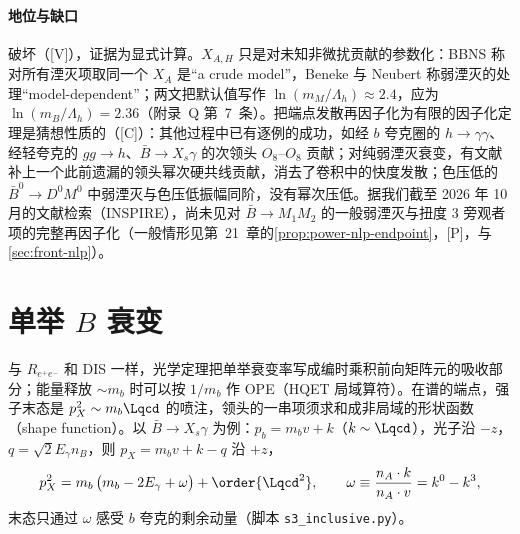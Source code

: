 \paragraph{地位与缺口}
破坏（[V]），证据为显式计算。$X_{A,H}$ 只是对未知非微扰贡献的参数化：BBNS 称对所有湮灭项取同一个 $X_A$ 是“a crude model”\cite{BenekeEtAl2001}，Beneke 与 Neubert 称弱湮灭的处理“model-dependent”\cite{BenekeNeubert2003}；两文把默认值写作 $\ln(m_M/\Lambda_h)\approx2.4$，应为 $\ln(m_B/\Lambda_h)=2.36$（附录~Q 第~7~条）。把端点发散再因子化为有限的因子化定理是猜想性质的（[C]）：其他过程中已有逐例的成功，如经 $b$ 夸克圈的 $h\to\gamma\gamma$\cite{Liu:2019oav,Liu:2020wbn}、经轻夸克的 $gg\to h$\cite{Liu:2022ajh}、$\bar B\to X_s\gamma$ 的次领头 $O_8$--$O_8$ 贡献\cite{Hurth:2023paz}；对纯弱湮灭衰变，有文献补上一个此前遗漏的领头幂次硬共线贡献，消去了卷积中的快度发散\cite{Lu:2022kos}；色压低的 $\bar B^0\to D^0M^0$ 中弱湮灭与色压低振幅同阶，没有幂次压低\cite{Mantry:2003uz}。据我们截至 2026 年 10 月的文献检索（INSPIRE），尚未见对 $\bar B\to M_1M_2$ 的一般弱湮灭与扭度 3 旁观者项的完整再因子化（一般情形见第~21~章的\cref{prop:power-nlp-endpoint}，[P]，与\cref{sec:front-nlp}）。

\section{单举 $B$ 衰变}\label{sec:heavy-inclusive}

与 $R_{e^+e^-}$ 和 DIS 一样，光学定理把单举衰变率写成编时乘积前向矩阵元的吸收部分；能量释放 $\sim m_b$ 时可以按 $1/m_b$ 作 OPE（HQET 局域算符）。在谱的端点，强子末态是 $p_X^2\sim m_b\Lqcd$ 的喷注，领头的一串项须求和成非局域的形状函数（shape function）。以 $\bar B\to X_s\gamma$ 为例：$p_b=m_bv+k$（$k\sim\Lqcd$），光子沿 $-z$，$q=\sqrt2E_\gamma n_B$，则 $p_X=m_bv+k-q$ 沿 $+z$，
\begin{equation}\label{eq:heavy-pX2}
p_X^2=m_b\,\big(m_b-2E_\gamma+\omega\big)+\order{\Lqcd^2},\qquad \omega\equiv\frac{n_A\cdot k}{n_A\cdot v}=k^0-k^3 ,
\end{equation}
末态只通过 $\omega$ 感受 $b$ 夸克的剩余动量（脚本 \texttt{s3\_\allowbreak inclusive.py}）。

